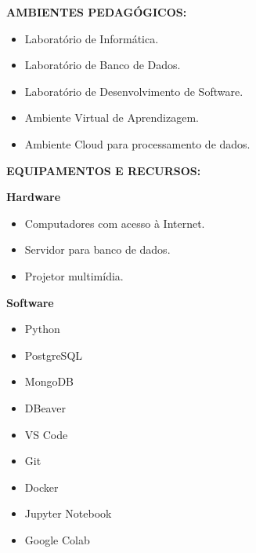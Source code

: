 \textbf{AMBIENTES PEDAGÓGICOS:}

\begin{itemize}
\item Laboratório de Informática.
\item Laboratório de Banco de Dados.
\item Laboratório de Desenvolvimento de Software.
\item Ambiente Virtual de Aprendizagem.
\item Ambiente Cloud para processamento de dados.
\end{itemize}

\textbf{EQUIPAMENTOS E RECURSOS:}

\textbf{Hardware}

\begin{itemize}
\item Computadores com acesso à Internet.
\item Servidor para banco de dados.
\item Projetor multimídia.
\end{itemize}

\textbf{Software}

\begin{itemize}
\item Python
\item PostgreSQL
\item MongoDB
\item DBeaver
\item VS Code
\item Git
\item Docker
\item Jupyter Notebook
\item Google Colab
\end{itemize}
